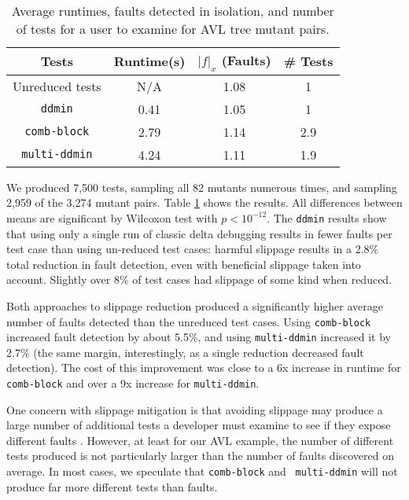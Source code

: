 \begin{table}
\centering
{\scriptsize
\begin{tabular}{|c|c|c|c|}
\hline
Tests & Runtime(s) & $|f|_x$ (Faults) & \# Tests\\
\hline
\hline
Unreduced tests & N/A & 1.08 & 1 \\
\hline
{\tt ddmin} & 0.41 & 1.05 & 1 \\
\hline
{\tt comb-block} & 2.79 & 1.14 & 2.9 \\
\hline
{\tt multi-ddmin} & 4.24 & 1.11 & 1.9 \\
\hline
\end{tabular}
}
\caption{Average runtimes, faults detected in isolation, and number of
  tests for a user to examine for AVL
  tree mutant pairs.}
\label{tab1}
\end{table}

We produced 7,500 tests, sampling all 82 mutants numerous times, and
sampling 2,959 of the 3,274 mutant pairs.  Table \ref{tab1} shows the
results.  All differences between means are significant by Wilcoxon
test with $p < 10^{-12}$.  The {\tt ddmin} results show that using
only a single run of classic delta debugging results in fewer faults
per test case than using un-reduced test cases:  harmful slippage
results in a 2.8\% total reduction in fault detection, even with
beneficial slippage taken into account.  Slightly over 8\% of test
cases had slippage of some kind when reduced.  

Both  approaches to slippage reduction produced a significantly higher
average number of faults detected than the unreduced test cases.
Using {\tt comb-block} increased fault detection by about 5.5\%, and
using {\tt multi-ddmin} increased it by 2.7\% (the same margin,
interestingly, as a single reduction decreased fault detection).  The
cost of this improvement was close to a 6x increase in runtime
for {\tt comb-block} and over a 9x increase for {\tt multi-ddmin}.

One concern with slippage mitigation is that avoiding slippage may
produce a large number of additional tests a developer must examine to
see if they expose different faults \cite{PLDI13}.  However, at least
for our AVL example, the number of different tests produced is not
particularly larger than the number of faults discovered on average.
In most cases, we speculate that {\tt comb-block} and {\tt
  multi-ddmin} will not produce far more different tests than faults.

